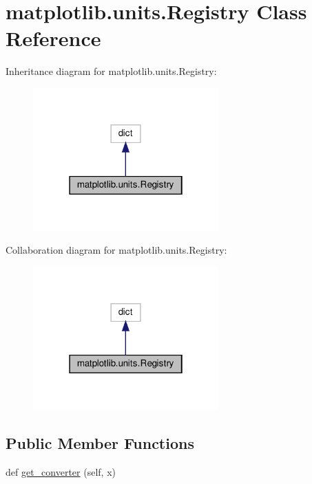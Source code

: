\hypertarget{classmatplotlib_1_1units_1_1Registry}{}\section{matplotlib.\+units.\+Registry Class Reference}
\label{classmatplotlib_1_1units_1_1Registry}


Inheritance diagram for matplotlib.\+units.\+Registry\+:
\nopagebreak
\begin{figure}[H]
\begin{center}
\leavevmode
\includegraphics[width=202pt]{classmatplotlib_1_1units_1_1Registry__inherit__graph}
\end{center}
\end{figure}


Collaboration diagram for matplotlib.\+units.\+Registry\+:
\nopagebreak
\begin{figure}[H]
\begin{center}
\leavevmode
\includegraphics[width=202pt]{classmatplotlib_1_1units_1_1Registry__coll__graph}
\end{center}
\end{figure}
\subsection*{Public Member Functions}
\begin{DoxyCompactItemize}
\item 
def \hyperlink{classmatplotlib_1_1units_1_1Registry_a4423acdb3e5a33b7a7ef21e21ef3c25c}{get\+\_\+converter} (self, x)
\end{DoxyCompactItemize}



